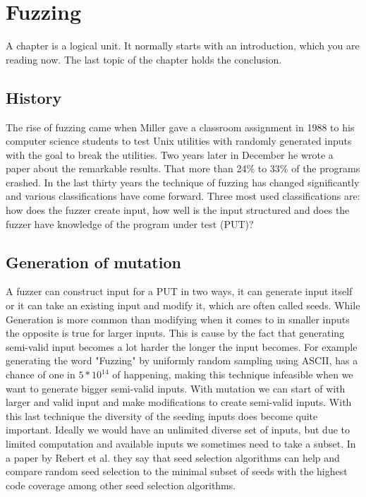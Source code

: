 \chapter{Fuzzing}
\label{cha:2:fuzzing}
A chapter is a logical unit. It normally starts with an introduction, which
you are reading now. The last topic of the chapter holds the conclusion.

%


\section{History} 
The rise of fuzzing came when Miller gave a classroom assignment\cite{21FuzzingAssignment} in 1988 to his computer science students to test Unix utilities with randomly generated inputs with the goal to break the utilities. Two years later in December he wrote a paper\cite{4originalFuzzingUnixUtils} about the remarkable results. That more than 24\% to 33\% of the programs crashed.
In the last thirty years the technique of fuzzing has changed significantly and various classifications have come forward\cite{12Fuzzingasurvey}\cite{13manes2019survey}. Three most used classifications are: 
how does the fuzzer create input, how well is the input structured and does the fuzzer have knowledge of the program under test (PUT)?

\section{Generation of mutation}
A fuzzer can construct input for a PUT in two ways, it can generate input itself or it can take an existing input and modify it, which are often called seeds. While Generation is more common than modifying when it comes to in smaller inputs the opposite is true for larger inputs. This is cause by the fact that generating semi-valid input becomes a lot harder the longer the input becomes. For example generating the word "Fuzzing" by uniformly random sampling using ASCII, has a chance of one in $5*10^{14}$ of happening, making this technique infeasible when we want to generate bigger semi-valid inputs. With mutation we can start of with larger and valid input and make modifications to create semi-valid inputs. With this last technique the diversity of the seeding inputs does become quite important. Ideally we would have an unlimited diverse set of inputs, but due to limited computation and available inputs we sometimes need to take a subset. In a paper by Rebert et al. \cite{14rebert2014seedselecting} they say that seed selection algorithms can help and compare random seed selection to the minimal subset of seeds with the highest code coverage among other seed selection algorithms. 

